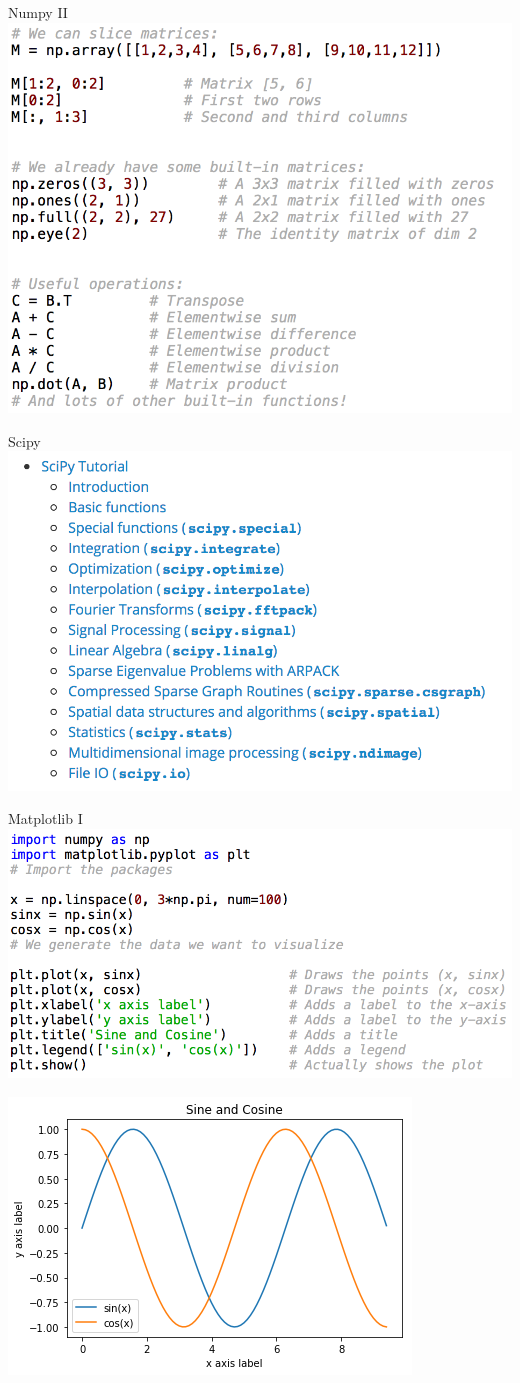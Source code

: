 \documentclass[11pt,unknownkeysallowed,usenames,dvipsnames]{beamer}
\begin{document}
\begin{frame}{Numpy II}
	\includegraphics[width=0.8\linewidth]{code-numpy2}
\end{frame}


\begin{frame}{Scipy}
    \includegraphics[width=0.9\linewidth]{code-scipy}
\end{frame}


\begin{frame}{Matplotlib I}
    \includegraphics[width=0.8\linewidth]{code-matplotlib1}
    
	\centering    \includegraphics[width=0.4\linewidth]{plot1}
\end{frame}
\end{document}
